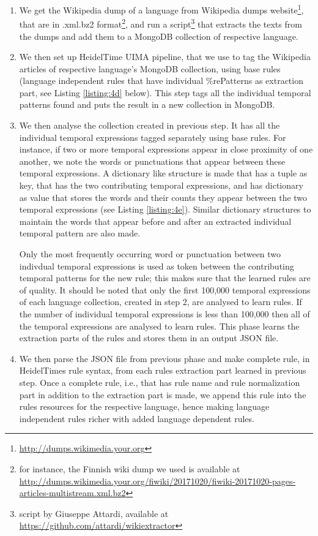 \begin{enumerate}[1.]
	\item We get the Wikipedia dump of a language from Wikipedia dumps website\footnote{\url{http://dumps.wikimedia.your.org}}, that are in .xml.bz2 format\footnote{for instance, the Finnish wiki dump we used is available at  \url{http://dumps.wikimedia.your.org/fiwiki/20171020/fiwiki-20171020-pages-articles-multistream.xml.bz2}}, and run a script\footnote{script by Giuseppe Attardi, available at \url{https://github.com/attardi/wikiextractor}} that extracts the texts from the dumps and add them to a MongoDB collection of respective language. 
	
	\item We then set up HeidelTime UIMA pipeline, that we use to tag the Wikipedia articles of respective language's MongoDB collection, using base rules (language independent rules that have individual \%rePatterns as extraction part, see Listing \ref{listing:4d} below). This step tags all the individual temporal patterns found and puts the result in a new collection in MongoDB.
	
	\item  We then analyse the collection created in previous step. It has all the individual temporal expressions tagged separately using base rules. For instance, if two or more temporal expressions appear in close proximity of one another, we note the words or punctuations that appear between these temporal expressions. A dictionary like structure is made that has a tuple as key, that has the two contributing temporal expressions, and has dictionary as value that stores the words and their counts they appear between the two temporal expressions (see Listing \ref{listing:4e}). Similar dictionary structures to maintain the words that appear before and after an extracted  individual temporal pattern are also made. 
	
	Only the most frequently occurring word or punctuation between two indivdual temporal expressions is used as token between the contributing temporal patterns for the new rule; this makes sure that the learned rules are of quality. It should be noted that only the first 100,000 temporal expressions of each language collection, created in step 2, are analysed to learn rules. If the number of individual temporal expressions is less than 100,000 then all of the temporal expressions are analysed to learn rules. This phase learns the extraction parts of the rules and stores them in an output JSON file.
	
	\item  We then parse the JSON file from previous phase and make complete rule, in HeidelTimes rule syntax, from each rules extraction part learned in previous step. Once a complete rule, i.e., that has rule name and rule normalization part in addition to the extraction part is made, we append this rule into the rules resources for the respective language, hence making language independent rules richer with added language dependent rules. 
\end{enumerate}

